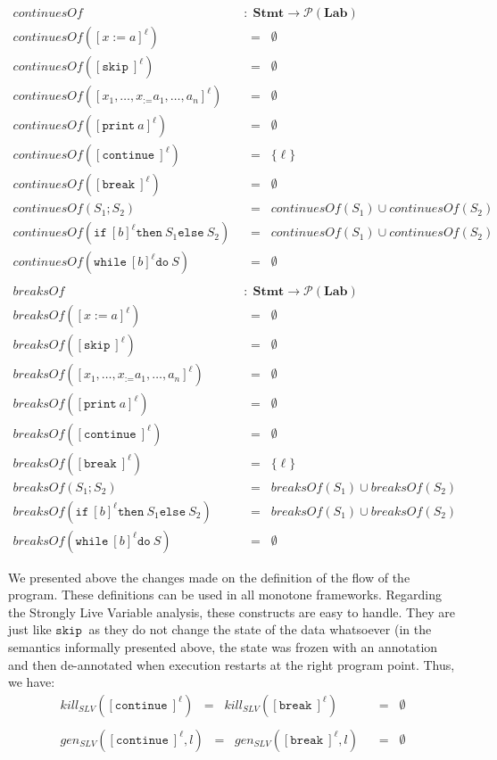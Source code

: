 \documentclass[a4wide,12pt]{article}
\def\eq{\;\; = \;\;}
\def\pset#1{\mathcal{P}(#1)}
\def\Stmt {\mathbf{Stmt}}
\def\Lab {\mathbf{Lab}}
\def\skip {\texttt{skip}\ }
\def\while{\texttt{while}\ }
\def\do {\texttt{do}\ }
\def\ifl {\texttt{if}\ }
\def\thenl {\texttt{then}\ }
\def\elsel {\texttt{else}\ }
\def\print{\texttt{print}\ }
\def\cont {\texttt{continue}\ }
\def\break{\texttt{break}\ }
\begin{document}
\begin{align*}
continuesOf & \; : \; \Stmt \to \pset{\Lab} \\
continuesOf([x:=a]^\ell) & \eq \emptyset \\
continuesOf([\skip]^\ell) & \eq \emptyset \\
continuesOf([x_1,\ldots,x_:=a_1,\ldots,a_n]^\ell) & \eq \emptyset \\
continuesOf([\print a]^\ell) & \eq \emptyset \\
continuesOf([\cont]^\ell) & \eq \{\ell\} \\
continuesOf([\break]^\ell) & \eq \emptyset \\
continuesOf(S_1;S_2) & \eq continuesOf(S_1) \cup continuesOf(S_2) \\
continuesOf(\ifl [b]^\ell \thenl S_1 \elsel S_2) & \eq continuesOf(S_1) \cup continuesOf(S_2) \\
continuesOf(\while [b]^\ell \do S) & \eq \emptyset \\
\\
breaksOf & \; : \; \Stmt \to \pset{\Lab} \\
breaksOf([x:=a]^\ell) & \eq \emptyset \\
breaksOf([\skip]^\ell) & \eq \emptyset \\
breaksOf([x_1,\ldots,x_:=a_1,\ldots,a_n]^\ell) & \eq \emptyset \\
breaksOf([\print a]^\ell) & \eq \emptyset \\
breaksOf([\cont]^\ell) & \eq \emptyset \\
breaksOf([\break]^\ell) & \eq \{\ell\} \\
breaksOf(S_1;S_2) & \eq breaksOf(S_1) \cup breaksOf(S_2) \\
breaksOf(\ifl [b]^\ell \thenl S_1 \elsel S_2) & \eq breaksOf(S_1) \cup breaksOf(S_2) \\
breaksOf(\while [b]^\ell \do S) & \eq \emptyset
\end{align*}
 
We presented above the changes made on the definition of the flow of the program.
These definitions can be used in all monotone frameworks. Regarding
the Strongly Live Variable analysis, these constructs are easy to handle. They
are just like $\skip$ as they do not change the state of the data whatsoever (in the
semantics informally presented above, the state was frozen with an annotation and then de-annotated
when execution restarts at the right program point. Thus, we have:
\begin{align*}
kill_{SLV}([\cont]^\ell) \eq kill_{SLV}([\break]^\ell) & \eq \emptyset \\
\\
gen_{SLV} ([\cont]^\ell,l) \eq gen_{SLV} ([\break]^\ell,l) & \eq \emptyset
\end{align*}
 
\end{document}
